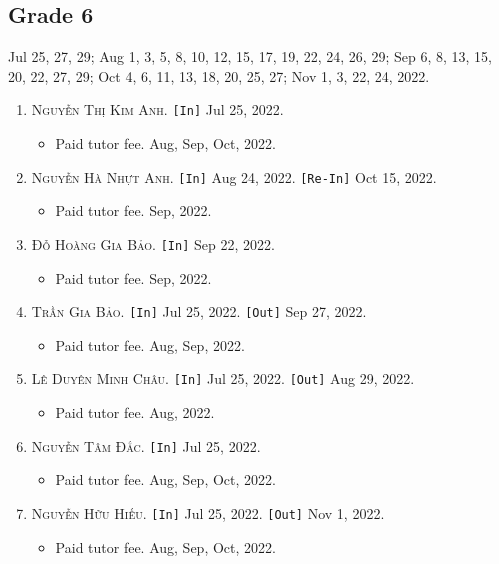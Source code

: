 \documentclass{article}
\numberwithin{equation}{section}
\begin{document}
\subsection{Grade 6}
Jul 25, 27, 29; Aug 1, 3, 5, 8, 10, 12, 15, 17, 19, 22, 24, 26, 29; Sep 6, 8, 13, 15, 20, 22, 27, 29; Oct 4, 6, 11, 13, 18, 20, 25, 27; Nov 1, 3, 22, 24, 2022.
\begin{enumerate}
	\item \textsc{Nguyễn Thị Kim Anh.} \texttt{[In]} Jul 25, 2022.
	\begin{itemize}
		\item \textsf{Paid tutor fee.} Aug, Sep, Oct, 2022.
	\end{itemize}
	\item \textsc{Nguyễn Hà Nhựt Anh.} \texttt{[In]} Aug 24, 2022. \texttt{[Re-In]} Oct 15, 2022.
	\begin{itemize}
		\item \textsf{Paid tutor fee.} Sep, 2022.
	\end{itemize}
	\item \textsc{Đỗ Hoàng Gia Bảo.} \texttt{[In]} Sep 22, 2022.
	\begin{itemize}
		\item \textsf{Paid tutor fee.} Sep, 2022.
	\end{itemize}
	\item \textsc{Trần Gia Bảo.} \texttt{[In]} Jul 25, 2022. \texttt{[Out]} Sep 27, 2022.
	\begin{itemize}
		\item \textsf{Paid tutor fee.} Aug, Sep, 2022.
	\end{itemize}
	\item \textsc{Lê Duyên Minh Châu.} \texttt{[In]} Jul 25, 2022. \texttt{[Out]} Aug 29, 2022.
	\begin{itemize}
		\item \textsf{Paid tutor fee.} Aug, 2022.
	\end{itemize}
	\item \textsc{Nguyễn Tâm Đắc.} \texttt{[In]} Jul 25, 2022.
	\begin{itemize}
		\item \textsf{Paid tutor fee.} Aug, Sep, Oct, 2022.
	\end{itemize}
	\item \textsc{Nguyễn Hữu Hiếu.} \texttt{[In]} Jul 25, 2022. \texttt{[Out]} Nov 1, 2022.
	\begin{itemize}
		\item \textsf{Paid tutor fee.} Aug, Sep, Oct, 2022.
	\end{itemize}

\end{enumerate}
\end{document}
